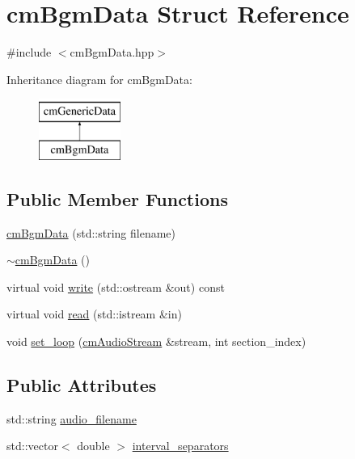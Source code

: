 \hypertarget{structcm_bgm_data}{\section{cm\-Bgm\-Data Struct Reference}
\label{structcm_bgm_data}
}


{\ttfamily \#include $<$cm\-Bgm\-Data.\-hpp$>$}

Inheritance diagram for cm\-Bgm\-Data\-:\begin{figure}[H]
\begin{center}
\leavevmode
\includegraphics[height=2.000000cm]{structcm_bgm_data}
\end{center}
\end{figure}
\subsection*{Public Member Functions}
\begin{DoxyCompactItemize}
\item 
\hyperlink{structcm_bgm_data_ac99aabc37df4108483a648d1830de941}{cm\-Bgm\-Data} (std\-::string filename)
\item 
\hyperlink{structcm_bgm_data_ada95990329aca702bc49fe7e05d6ee7b}{$\sim$cm\-Bgm\-Data} ()
\item 
virtual void \hyperlink{structcm_bgm_data_a1ae21b4514acc4e323ce48df82186665}{write} (std\-::ostream \&out) const 
\item 
virtual void \hyperlink{structcm_bgm_data_ad13cc535ceefff68c863039f2e7bcddc}{read} (std\-::istream \&in)
\item 
void \hyperlink{structcm_bgm_data_a19c7f617714efd926e309575b99559f7}{set\-\_\-loop} (\hyperlink{classcm_audio_stream}{cm\-Audio\-Stream} \&stream, int section\-\_\-index)
\end{DoxyCompactItemize}
\subsection*{Public Attributes}
\begin{DoxyCompactItemize}
\item 
std\-::string \hyperlink{structcm_bgm_data_a344c7b7b4460aaba2a1c8f485f3b22b9}{audio\-\_\-filename}
\item 
std\-::vector$<$ double $>$ \hyperlink{structcm_bgm_data_aeca3c28ceaf6655aa18ace1c030589c1}{interval\-\_\-separators}
\end{DoxyCompactItemize}


